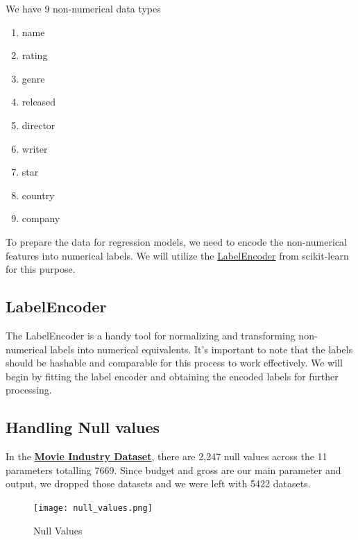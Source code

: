 \documentclass[conference]{IEEEtran}
\begin{document}
        We have 9 non-numerical data types
        \begin{enumerate}
            \item name
            \item rating
            \item genre
            \item released
            \item director
            \item writer
            \item star
            \item country
            \item company
        \end{enumerate}
        
        To prepare the data for regression models, we need to encode the non-numerical features into numerical labels. We will utilize the \href{https://scikit-learn.org/stable/modules/generated/sklearn.preprocessing.LabelEncoder.html}{LabelEncoder} from scikit-learn for this purpose.
        
        \subsection*{LabelEncoder}
            The LabelEncoder is a handy tool for normalizing and transforming non-numerical labels into numerical equivalents. It's important to note that the labels should be hashable and comparable for this process to work effectively. We will begin by fitting the label encoder and obtaining the encoded labels for further processing.
            
        \subsection*{Handling Null values}
            In the \href{https://www.kaggle.com/datasets/danielgrijalvas/movies}{\textbf{Movie Industry Dataset}}, there are 2,247 null values across the 11 parameters totalling 7669.
            Since budget and gross are our main parameter and output, we dropped those datasets and we were left with 5422 datasets.
            
            \begin{figure}
                \centering \texttt{[image: null\_values.png]}
                \caption{Null Values}
                \label{fig:null-values}
            \end{figure}
            
\end{document}
